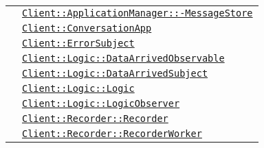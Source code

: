 \begin{longtable}{|>{\centering}m{3cm}|m{10cm}<{\centering}|}
& \hyperref[Client::ApplicationManager::MessageStore]{\texttt{Client::ApplicationManager::-\linebreak MessageStore}}\\
& \hyperref[Client::ConversationApp]{\texttt{Client::ConversationApp}}\\
& \hyperref[Client::ErrorSubject]{\texttt{Client::ErrorSubject}}\\
& \hyperref[Client::Logic::DataArrivedObservable]{\texttt{Client::Logic::DataArrivedObservable}}\\
& \hyperref[Client::Logic::DataArrivedSubject]{\texttt{Client::Logic::DataArrivedSubject}}\\
& \hyperref[Client::Logic::Logic]{\texttt{Client::Logic::Logic}}\\
& \hyperref[Client::Logic::LogicObserver]{\texttt{Client::Logic::LogicObserver}}\\
& \hyperref[Client::Recorder::Recorder]{\texttt{Client::Recorder::Recorder}}\\
& \hyperref[Client::Recorder::RecorderWorker]{\texttt{Client::Recorder::RecorderWorker}}\\ \hline


\end{longtable}
